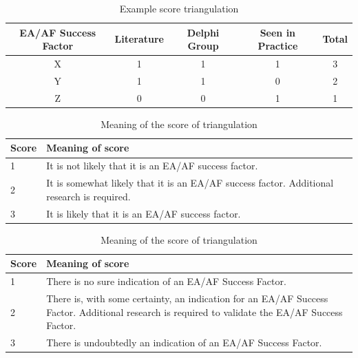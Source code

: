 \begin{table}[!h]
	\begin{center}
		\begin{tabular}{@{}ccccc@{}}
			\toprule
			EA/AF Success Factor & Literature & Delphi Group & Seen in Practice & Total \\ \midrule
			X    & 1    & 1   & 1   & 3   \\
			Y    & 1    & 1  & 0   & 2   \\
			Z    & 0    & 0   & 1   & 1   \\ \bottomrule
		\end{tabular}
		\caption{Example score triangulation}
		\label{tab:exampletriangulation}
	\end{center}
\end{table}

\begin{table}[!h]
	\begin{center}
		\begin{tabular}{@{}p{}p{}@{}}
			\toprule
			Score 	& Meaning of score \\ \midrule
			1		& It is not likely that it is an EA/AF success factor. \\
			2    	& It is somewhat likely that it is an EA/AF success factor. Additional research is required.\\
			3    	& It is likely that it is an EA/AF success factor. \\ \bottomrule
		\end{tabular}
		\caption{Meaning of the score of triangulation}
		\label{tab:exampletriangulationscoring}
	\end{center}
\end{table}

\begin{table}[!h]
	\begin{center}
		\begin{tabular}{p{}p{}}
			\toprule
			Score 	& Meaning of score \\ \midrule
			1		& There is no sure indication of an EA/AF Success Factor. \\
			2    	& There is, with some certainty, an indication for an EA/AF Success Factor. Additional research is required to validate the EA/AF Success Factor. \\
			3    	& There is undoubtedly an indication of an EA/AF Success Factor. \\ \bottomrule
		\end{tabular}
		\caption{Meaning of the score of triangulation}
		\label{tab:oldexampletriangulationscoring}
	\end{center}
\end{table}


